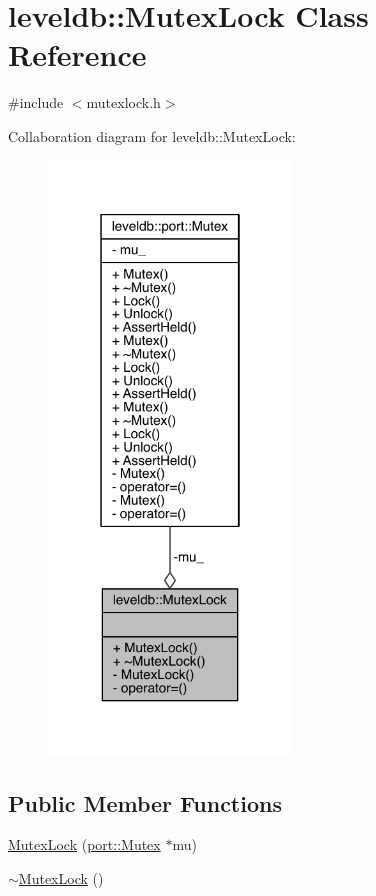 \hypertarget{classleveldb_1_1_mutex_lock}{}\section{leveldb\+:\+:Mutex\+Lock Class Reference}
\label{classleveldb_1_1_mutex_lock}


{\ttfamily \#include $<$mutexlock.\+h$>$}



Collaboration diagram for leveldb\+:\+:Mutex\+Lock\+:\nopagebreak
\begin{figure}[H]
\begin{center}
\leavevmode
\includegraphics[width=183pt]{classleveldb_1_1_mutex_lock__coll__graph}
\end{center}
\end{figure}
\subsection*{Public Member Functions}
\begin{DoxyCompactItemize}
\item 
\hyperlink{classleveldb_1_1_mutex_lock_a9ef48d3cfc7d463344d1b41d2514d7ff}{Mutex\+Lock} (\hyperlink{classleveldb_1_1port_1_1_mutex}{port\+::\+Mutex} $\ast$mu)
\item 
\hyperlink{classleveldb_1_1_mutex_lock_aedf27099a8c20cc13d2f81d33ce6d11c}{$\sim$\+Mutex\+Lock} ()
\end{DoxyCompactItemize}
